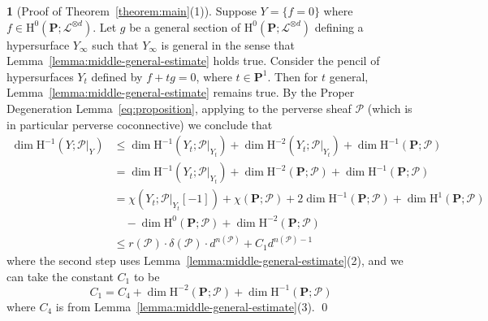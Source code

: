 \documentclass[english]{smfart}
\renewcommand{\mathbb}{\mathbf}
\renewcommand{\leq}{\leqslant}
\theoremstyle{remark}
\theoremstyle{plain}
\theoremstyle{definition}
\numberwithin{equation}{remark}
\theoremstyle{void}
\newtheorem{situation}[remark]{}
\begin{document}
\begin{situation}[Proof of Theorem~\ref{theorem:main}(1)]
\label{situation:proof-1}
Suppose \(Y = \{f = 0\}\) where
\(f \in \mathrm{H}^0(\mathbb{P};\mathscr{L}^{\otimes d})\).  Let \(g\)
be a general section of
\(\mathrm{H}^0(\mathbb{P};\mathscr{L}^{\otimes d})\) defining a
hypersurface \(Y_{\infty}\) such that \(Y_{\infty}\) is general in the
sense that Lemma~\ref{lemma:middle-general-estimate} holds true.
Consider the pencil of hypersurfaces \(Y_t\) defined by
\(f + tg = 0\), where \(t \in \mathbb{P}^1\).  Then for \(t\) general,
Lemma~\ref{lemma:middle-general-estimate} remains true.  By the
Proper Degeneration Lemma~\eqref{eq:proposition},
applying to the perverse sheaf \(\mathcal{P}\) (which is in particular
perverse coconnective) we conclude that
\begin{align}
  \dim \mathrm{H}^{-1}(Y;\mathcal{P}|_Y)
  &\leq  \dim \mathrm{H}^{-1}(Y_t;\mathcal{P}|_{Y_t}) +
    \dim \mathrm{H}^{-2}(Y_t;\mathcal{P}|_{Y_{t}}) + \dim \mathrm{H}^{-1}(\mathbb{P};\mathcal{P}) \nonumber
  \\
  &=  \dim \mathrm{H}^{-1}(Y_t;\mathcal{P}|_{Y_t}) +
    \dim \mathrm{H}^{-2}(\mathbb{P};\mathcal{P}) + \dim \mathrm{H}^{-1}(\mathbb{P};\mathcal{P}) \nonumber
  \\
  &= \chi(Y_t; \mathcal{P}|_{Y_t}[-1]) + \chi(\mathbb{P};\mathcal{P}) + 2\dim \mathrm{H}^{-1}(\mathbb{P};\mathcal{P}) + \dim \mathrm{H}^1(\mathbb{P};\mathcal{P}) \label{eq:explicit-1}\\
  &\quad - \dim \mathrm{H}^0(\mathbb{P};\mathcal{P}) + \dim \mathrm{H}^{-2}(\mathbb{P};\mathcal{P})\nonumber \\
  &\leq r(\mathcal{P}) \cdot \delta(\mathcal{P}) \cdot d^{n(\mathcal{P})} + C_1 d^{n(\mathcal{P})-1}
    \nonumber
\end{align}
where the second step uses
Lemma~\ref{lemma:middle-general-estimate}(2), and we can take the
constant \(C_1\) to be
\begin{equation}\label{eq:C1}
C_1 = C_4 + \dim \mathrm{H}^{-2}(\mathbb{P};\mathcal{P}) + \dim \mathrm{H}^{-1}(\mathbb{P};\mathcal{P})
\end{equation}
where \(C_4\) is from Lemma~\ref{lemma:middle-general-estimate}(3).
\qed
\end{situation}
\end{document}
